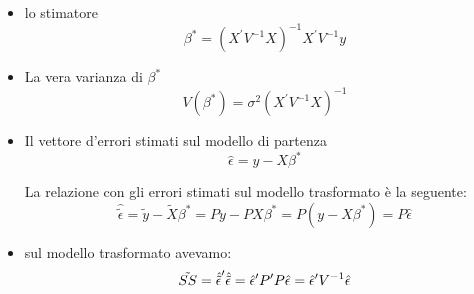 \documentclass[a4paper]{report}
\theoremstyle{remark}
\begin{document}
\begin{enumerate}
\begin{itemize}
\item lo stimatore 
\begin{equation}
\beta ^{\ast }=(X^{\prime }V^{-1}X)^{-1}X^{\prime }V^{-1}y
\label{formula mqg}
\end{equation}

\item La vera varianza di $\beta ^{\ast }$%
\begin{equation*}
V(\beta ^{\ast })=\sigma ^{2}(X^{\prime }V^{-1}X)^{-1}
\end{equation*}

\item Il vettore d'errori stimati sul modello di partenza 
\begin{equation*}
\hat{\epsilon}=y-X\beta ^{\ast }
\end{equation*}

La relazione con gli errori stimati sul modello trasformato \`{e} la
seguente: 
\begin{equation*}
\hat{\tilde{\epsilon}}=\tilde{y}-\tilde{X}\beta ^{\ast }=Py-PX\beta ^{\ast
}=P(y-X\beta ^{\ast })=P\hat{\epsilon}
\end{equation*}

\item sul modello trasformato avevamo: 
\begin{equation*}
\tilde{SS}={\hat{\tilde{\epsilon}}}^{\prime }\hat{\tilde{\epsilon}}=\hat{%
\epsilon}^{\prime }P^{\prime }P\hat{\epsilon}=\hat{\epsilon}^{\prime }V^{-1}%
\hat{\epsilon}
\end{equation*}
\end{itemize}


\end{enumerate}
\end{document}
